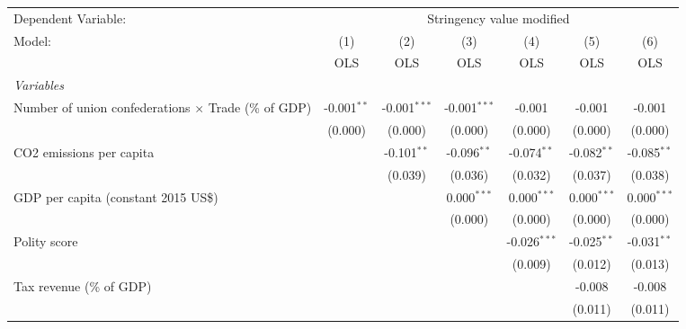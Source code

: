 
\begingroup
\centering
\begin{tabular}{lcccccc}
   \toprule
   Dependent Variable: & \multicolumn{6}{c}{Stringency value modified}\\
   Model:                                                      & (1)           & (2)            & (3)            & (4)            & (5)           & (6)\\  
                                                               &  OLS          & OLS            & OLS            & OLS            & OLS           & OLS\\  
   \midrule
   \emph{Variables}\\
   Number of union confederations $\times$ Trade (\% of GDP)   & -0.001$^{**}$ & -0.001$^{***}$ & -0.001$^{***}$ & -0.001         & -0.001        & -0.001\\   
                                                               & (0.000)       & (0.000)        & (0.000)        & (0.000)        & (0.000)       & (0.000)\\   
   CO2 emissions per capita                                    &               & -0.101$^{**}$  & -0.096$^{**}$  & -0.074$^{**}$  & -0.082$^{**}$ & -0.085$^{**}$\\   
                                                               &               & (0.039)        & (0.036)        & (0.032)        & (0.037)       & (0.038)\\   
   GDP per capita (constant 2015 US\$)                         &               &                & 0.000$^{***}$  & 0.000$^{***}$  & 0.000$^{***}$ & 0.000$^{***}$\\   
                                                               &               &                & (0.000)        & (0.000)        & (0.000)       & (0.000)\\   
   Polity score                                                &               &                &                & -0.026$^{***}$ & -0.025$^{**}$ & -0.031$^{**}$\\   
                                                               &               &                &                & (0.009)        & (0.012)       & (0.013)\\   
   Tax revenue (\% of GDP)                                     &               &                &                &                & -0.008        & -0.008\\   
                                                               &               &                &                &                & (0.011)       & (0.011)\\   

\end{tabular}
